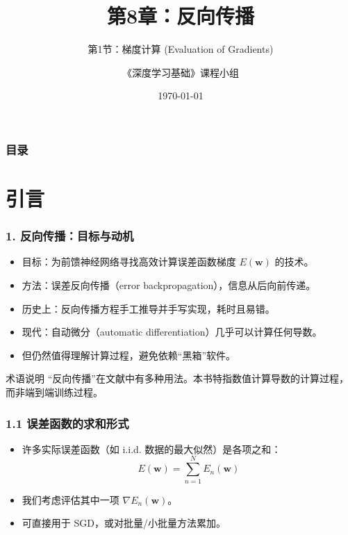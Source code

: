 \documentclass[t,aspectratio=169]{beamer} %
\title[8.1.梯度计算]{第8章：反向传播}
\subtitle{第1节：梯度计算 (Evaluation of Gradients)}
\author{《深度学习基础》课程小组}
\date{\today}
\begin{document}
\frame{\titlepage}

\begin{frame}
    \frametitle{目录}
    \tableofcontents
\end{frame}

\section{引言}

\begin{frame}
    \frametitle{1. 反向传播：目标与动机}
    \begin{itemize}
        \item 目标：为前馈神经网络寻找\alert{高效计算误差函数梯度 $E(\mathbf{w})$} 的技术。
        \item 方法：\alert{误差反向传播}（error backpropagation），信息从后向前传递。
        \item 历史上：反向传播方程手工推导并手写实现，耗时且易错。
        \item 现代：\alert{自动微分}（automatic differentiation）几乎可以计算任何导数。
        \item 但仍然值得理解计算过程，避免依赖“黑箱”软件。
    \end{itemize}
    \begin{block}{术语说明}
        “反向传播”在文献中有多种用法。本书特指\alert{数值计算导数的计算过程}，而非端到端训练过程。
    \end{block}
\end{frame}

\begin{frame}
    \frametitle{1.1 误差函数的求和形式}
    \begin{itemize}
        \item 许多实际误差函数（如 i.i.d. 数据的最大似然）是\alert{各项之和}：
        \begin{equation}
            E(\mathbf{w}) = \sum_{n=1}^N E_n(\mathbf{w})
            \tag{8.1}
        \end{equation}
        \item 我们考虑评估其中\alert{一项} $\nabla E_n(\mathbf{w})$。
        \item 可直接用于 SGD，或对批量/小批量方法累加。
    \end{itemize}
\end{frame}

\end{document}
